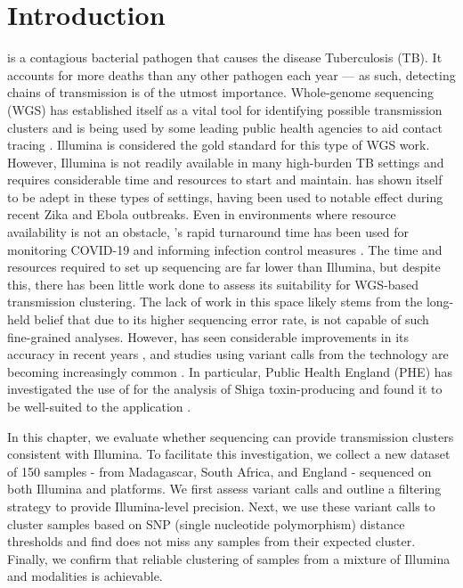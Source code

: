 
\section{Introduction}
\mtb{} is a contagious bacterial pathogen that causes the disease Tuberculosis (TB). It accounts for more deaths than any other pathogen each year \cite{who2020} — as such, detecting chains of \mtb{} transmission is of the utmost importance. Whole-genome sequencing (WGS) has established itself as a vital tool for identifying possible transmission clusters and is being used by some leading public health agencies to aid contact tracing \cite{phe-tb-england,brooks2020}. Illumina is considered the gold standard for this type of WGS work. However, Illumina is not readily available in many high-burden TB settings and requires considerable time and resources to start and maintain. \ont{} has shown itself to be adept in these types of settings, having been used to notable effect during recent Zika \cite{faria2016} and Ebola \cite{quick2016,Hoenen2016} outbreaks. Even in environments where resource availability is not an obstacle, \ont{}'s rapid turnaround time has been used for monitoring COVID-19 and informing infection control measures \cite{meredith2020}. The time and resources required to set up \ont{} sequencing are far lower than Illumina, but despite this, there has been little work done to assess its suitability for \mtb{} WGS-based transmission clustering. The lack of work in this space likely stems from the long-held belief that due to its higher sequencing error rate, \ont{} is not capable of such fine-grained analyses. However, \ont{} has seen considerable improvements in its accuracy in recent years \cite{wick2019}, and studies using variant calls from the technology are becoming increasingly common \cite{sanderson2020,watson2020}. In particular, Public Health England (PHE) has investigated the use of \ont{} for the analysis of Shiga toxin-producing \ecoli{} and found it to be well-suited to the application \cite{greig2021}. 

In this chapter, we evaluate whether \ont{} sequencing can provide \mtb{} transmission clusters consistent with Illumina. To facilitate this investigation, we collect a new dataset of 150 samples - from Madagascar, South Africa, and England - sequenced on both Illumina and \ont{} platforms. We first assess \ont{} variant calls and outline a filtering strategy to provide Illumina-level precision. Next, we use these variant calls to cluster samples based on SNP (single nucleotide polymorphism) distance thresholds and find \ont{} does not miss any samples from their expected cluster. Finally, we confirm that reliable clustering of samples from a mixture of Illumina and \ont{} modalities is achievable.

